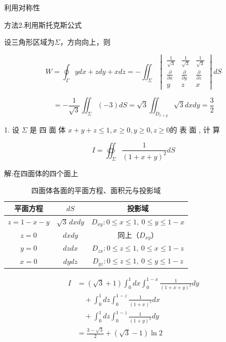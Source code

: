 \documentclass{article}
\begin{document}
利用对称性


方法2.利用斯托克斯公式

设三角形区域为$\Sigma$，方向向上，则

$$W=\oint_{\Gamma}ydx+zdy+xdz=-\iint_{\Sigma}\begin{vmatrix}\frac{1}{\sqrt{3}}&\frac{1}{\sqrt{3}}&\frac{1}{\sqrt{3}}\\\frac{\partial}{\partial x}&\frac{\partial}{\partial y}&\frac{\partial}{\partial z}\\y&z&x\end{vmatrix}dS$$

$$=-\frac{1}{\sqrt{3}}\iint_{\Sigma}(-3)dS=\sqrt{3}\iint_{D_{x+y}}\sqrt{3}dxdy=\frac{3}{2}$$


\newpage


1. 设  $\Sigma$ 是 四 面 体 $x+ y+ z\leq 1, x\geq 0, y\geq 0, z\geq 0$的 表 面 ,  计 算  

$$I= \oiint _{\Sigma }\frac 1{( 1+ x+ y) ^2}dS$$

解:在四面体的四个面上

\begin{table}[htbp]
  \centering
  \caption{四面体各面的平面方程、面积元与投影域}
  \label{tab:tetrahedron_surface}
  \renewcommand{\arraystretch}{1.8} %
  \begin{tabular}{ccc}
    \toprule
    \textbf{平面方程} & \textbf{$dS$} & \textbf{投影域} \\
    \midrule
    $z = 1 - x - y$ & $\sqrt{3}\,dxdy$ & $D_{xy}: 0 \leq x \leq 1,\ 0 \leq y \leq 1-x$ \\
    \midrule
    $z = 0$ & $dxdy$ & 同上（$D_{xy}$） \\
    \midrule
    $y = 0$ & $dzdx$ & $D_{zx}: 0 \leq z \leq 1,\ 0 \leq x \leq 1-z$ \\
    \midrule
    $x = 0$ & $dydz$ & $D_{yz}: 0 \leq z \leq 1,\ 0 \leq y \leq 1-z$ \\
    \bottomrule
  \end{tabular}
\end{table}

$$\begin{aligned}I&=(\sqrt{3}+1)\int_0^1dx\int_0^{1-x}\frac{1}{(1+x+y)^2}dy\\&\quad+\int_0^1dz\int_0^{1-z}\frac{1}{(1+x)^2}dx\\&\quad+\int_0^1dz\int_0^{1-z}\frac{1}{(1+y)^2}dy\\&=\frac{3-\sqrt{3}}{2}+(\sqrt{3}-1)\ln2\end{aligned}$$
\end{document}
